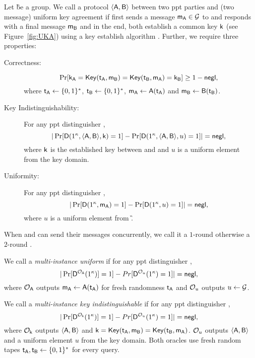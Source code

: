 \begin{definition} 
Let \G be a group.
We call a protocol $\langle \mathsf{A},\mathsf{B}\rangle$ between two ppt parties \A and \B (two message) uniform key agreement if \A first sends a message $\mathsf{m}_\mathsf{A}\in\mathcal{G}$ to \B and \B responds with a final message $\mathsf{m}_\mathsf{B}$ and in the end, both establish a common key $\mathsf{k}$ (see Figure~\ref{fig:UKA}) using a key establish algorithm \EK. Further, we require three properties:
\begin{description}
\item[Correctness:]
$$
\Pr[\mathsf{k}_\mathsf{A}=\mathsf{Key}(\mathsf{t}_\mathsf{A},\mathsf{m}_\mathsf{B})=\mathsf{Key}(\mathsf{t}_\mathsf{B},\mathsf{m}_\mathsf{A})=\mathsf{k}_\mathsf{B}]\geq 1-\mathsf{negl},
$$
where $\mathsf{t}_\mathsf{A}\leftarrow\{0,1\}^*$, $\mathsf{t}_\mathsf{B}\leftarrow\{0,1\}^*$, $\mathsf{m}_\mathsf{A}\leftarrow\mathsf{A}(\mathsf{t}_\mathsf{A})$ and $\mathsf{m}_\mathsf{B}\leftarrow\mathsf{B}(\mathsf{t}_\mathsf{B})$.
\item [Key Indistinguishability:] For any ppt distinguisher \D,
$$ 
|\Pr[\mathsf D(1^\kappa,\langle \mathsf{A},\mathsf{B}\rangle, \mathsf{k})=1]-\Pr[\mathsf D(1^\kappa,\langle \mathsf{A},\mathsf{B}\rangle, u)=1]|=\mathsf{negl},
$$
where $\mathsf{k}$ is the established key between \A and \B and $u$ is a uniform element from the key domain.
\item [Uniformity:] For any ppt distinguisher \D, 
$$
|\Pr[\mathsf D(1^\kappa,\mathsf{m}_\mathsf{A})=1]-\Pr[\mathsf D( 1^\kappa,u)=1]|=\mathsf{negl},
$$
where $u$ is a uniform element from \G.
\end{description}
When \A and \B can send their messages concurrently, we call it a $1$-round \UKA otherwise a $2$-round \UKA.
\end{definition}

\begin{definition}
We call a \UKA \emph{multi-instance uniform} if for any ppt distinguisher \D,
$$
|\Pr[\mathsf D^{\mathcal O_{\mathsf{A}}}(1^{\kappa})]=1]-Pr[\mathsf D^{\mathcal O_{u}}(1^{\kappa})=1]|=\mathsf{negl},
$$
where $\mathcal O_{\mathsf{A}}$ outputs $\mathsf{m}_\mathsf{A}\leftarrow\mathsf{A}(\mathsf{t}_\mathsf{A})$ for fresh randomness $\mathsf{t}_\mathsf{A}$ and $\mathcal O_u$ outputs $u\leftarrow\mathcal{G}$.
\end{definition}

\begin{definition}
We call a \UKA \emph{multi-instance key indistinguishable} if for any ppt distinguisher \D,
$$
|\Pr[\mathsf D^{\mathcal O_{\mathsf{k}}}(1^{\kappa})]=1]-Pr[\mathsf D^{\mathcal O_{u}}(1^{\kappa})=1]|=\mathsf{negl},
$$
where $\mathcal O_{\mathsf{k}}$ outputs  $\langle \mathsf{A},\mathsf{B}\rangle$ and $\mathsf{k}=\mathsf{Key}(\mathsf{t}_\mathsf{A},\mathsf{m}_\mathsf{B})=\mathsf{Key}(\mathsf{t}_\mathsf{B},\mathsf{m}_\mathsf{A})$. $\mathcal O_u$ outputs $\langle \mathsf{A},\mathsf{B}\rangle$ and a uniform element $u$ from the key domain. Both oracles use fresh random tapes $\mathsf{t}_\mathsf{A},\mathsf{t}_\mathsf{B}\leftarrow\{0,1\}^*$ for every query.
\end{definition}


